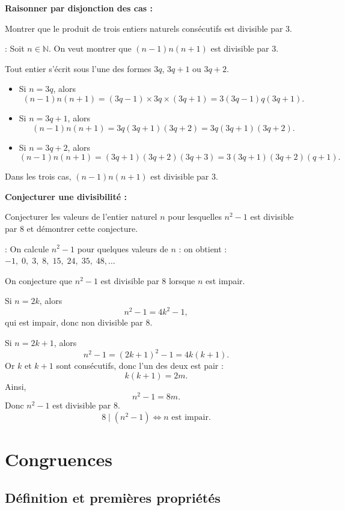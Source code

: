 \exerciceresolu
\textbf{Raisonner par disjonction des cas :}

Montrer que le produit de trois entiers naturels consécutifs est divisible par $3$.

\solution : Soit $n\in\mathbb N$. On veut montrer que
$(n-1)n(n+1)$ est divisible par $3$.

Tout entier s'écrit sous l'une des formes $3q$, $3q+1$ ou $3q+2$.

\begin{itemize}[label=\textbullet]

	\item Si $n=3q$, alors
	$$
	(n-1)n(n+1)=(3q-1)\times3q\times(3q+1)
	=3(3q-1)q(3q+1).
	$$
	\item Si $n=3q+1$, alors
	$$
	(n-1)n(n+1)=3q(3q+1)(3q+2)
	=3q(3q+1)(3q+2).
	$$
	\item Si $n=3q+2$, alors
	$$
	(n-1)n(n+1)=(3q+1)(3q+2)(3q+3)
	=3(3q+1)(3q+2)(q+1).
	$$

\end{itemize}

Dans les trois cas, $(n-1)n(n+1)$ est divisible par $3$.

\exerciceresolu
\textbf{Conjecturer une divisibilité :}

Conjecturer les valeurs de l'entier naturel $n$ pour lesquelles $n^2-1$ est divisible par $8$ et démontrer cette conjecture.

\solution : On calcule $n^2-1$ pour quelques valeurs de $n$ : on obtient : $-1,\;0,\;3,\;8,\;15,\;24,\;35,\;48,\ldots$

On conjecture que $n^2-1$ est divisible par $8$ lorsque $n$ est impair.

Si $n=2k$, alors
$$
n^2-1=4k^2-1,
$$
qui est impair, donc non divisible par $8$.

Si $n=2k+1$, alors
$$
n^2-1=(2k+1)^2-1=4k(k+1).
$$
Or $k$ et $k+1$ sont consécutifs, donc l'un des deux est pair :
$$
k(k+1)=2m.
$$
Ainsi,
$$
n^2-1=8m.
$$
Donc $n^2-1$ est divisible par $8$.
\[
\boxed{\;8\mid(n^2-1)\iff n\text{ est impair.}\;}
\]

\section{Congruences}

\subsection{Définition et premières propriétés}

